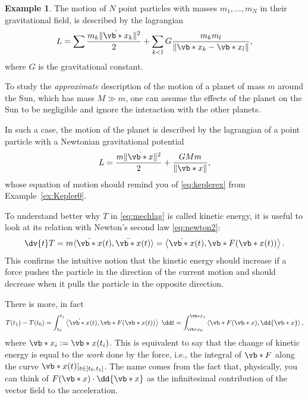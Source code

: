 \documentclass[english,fontsize=11pt,paper=b5]{scrbook}
\theoremstyle{definition}
\newtheorem{example}{Example}[chapter]
\begin{document}
    \begin{example}\label{ex:kepler1}
      The motion of $N$ point particles with masses $m_1, \ldots, m_N$ in their gravitational field, is described by the lagrangian
      \begin{equation}
        L = \sum\frac{m_k \|\dot{\vb*{x}}_k\|^2}{2} + \sum_{k < l} G \frac{m_k m_l}{\|\vb*{x}_k - \vb*{x}_l\|},
      \end{equation}
      where $G$ is the gravitational constant.

      To study the \emph{approximate} description of the motion of a planet of mass $m$ around the Sun, which has mass $M \gg m$, one can assume the effects of the planet on the Sun to be negligible and ignore the interaction with the other planets.

      In such a case, the motion of the planet is described by the lagrangian of a point particle with a Newtonian gravitational potential
      \begin{equation}
        L = \frac{m\|\dot{\vb*{x}}\|^2}{2} + \frac{G M m}{\|\vb*{x}\|},
      \end{equation}
      whose equation of motion should remind you of \eqref{eq:keplerex} from Example~\ref{ex:Kepler0}.
    \end{example}

    To understand better why $T$ in \eqref{eq:mechlag} is called kinetic energy, it is useful to look at its relation with Newton's second law \eqref{eq:newton2}:
    \begin{equation}
      \dv{t} T
      = m \langle\dot{\vb*{x}}(t), \ddot{\vb*{x}}(t)\rangle
      = \left\langle\dot{\vb*{x}}(t), \vb*{F}(\vb*{x}(t))\right\rangle.
    \end{equation}
    This confirms the intuitive notion that the kinetic energy should increase if a force pushes the particle in the direction of the current motion and should decrease when it pulls the particle in the opposite direction.

    There is more, in fact
    \begin{equation}
      T(t_1) - T(t_0) = \int_{t_0}^{t_1} \left\langle\dot{\vb*{x}}(t), \vb*{F}(\vb*{x}(t))\right\rangle\; \dd t = \int_{\vb*{x}_0}^{\vb*{x}_1} \left\langle\vb*{F}(\vb*{x}), \dd{\vb*{x}}\right\rangle,
    \end{equation}
    where $\vb*{x}_i := \vb*{x}(t_i)$.
    This is equivalent to say that the change of kinetic energy is equal to the \emph{work} done by the force, i.e., the integral of $\vb*{F}$ along the curve $\vb*{x}(t)|_{t\in[t_0, t_1]}$. The name comes from the fact that, physically, you can think of $F(\vb*{x}) \cdot \dd{\vb*{x}}$ as the infinitesimal contribution of the vector field to the acceleration.
\end{document}
